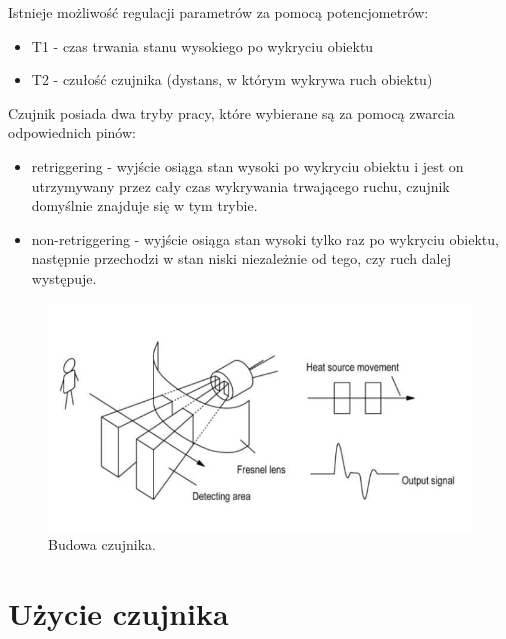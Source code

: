 \documentclass[11pt, a4paper]{article}
\begin{document}
Istnieje możliwość regulacji parametrów za pomocą potencjometrów:

\begin{itemize}
    \item T1 - czas trwania stanu wysokiego po wykryciu obiektu 
    \item T2 - czułość czujnika (dystans, w którym wykrywa ruch obiektu)
\end{itemize}

Czujnik posiada dwa tryby pracy, które wybierane są za pomocą zwarcia odpowiednich pinów:
\begin{itemize}
    \item retriggering - wyjście osiąga stan wysoki po wykryciu obiektu i jest on utrzymywany przez cały czas wykrywania trwającego ruchu, czujnik domyślnie znajduje się w tym trybie.
    \item non-retriggering  - wyjście osiąga stan wysoki tylko raz po wykryciu obiektu, następnie przechodzi w stan niski niezależnie od tego, czy ruch dalej występuje.
\end{itemize}

\begin{figure}[h]
\centering
\includegraphics[width=.62\linewidth]{fig/element/dzialanie.png}
\caption{Budowa czujnika.\cite{fot3}}
\label{fig:test}
\end{figure}
\vspace{0.5cm}

\newpage
\section{Użycie czujnika}
\end{document}
